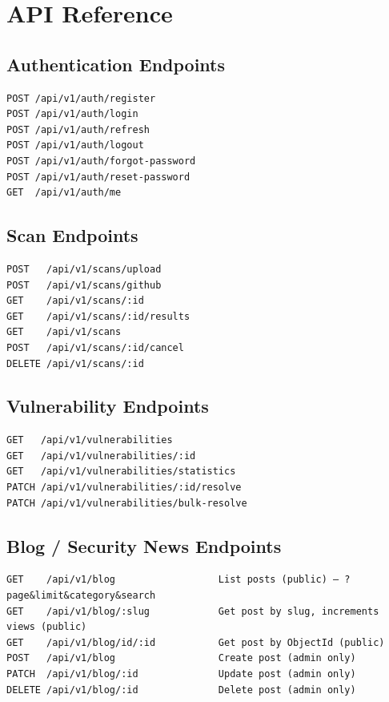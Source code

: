 \documentclass[12pt,a4paper]{report}
\begin{document}
\chapter{API Reference}
\label{app:api}

\section{Authentication Endpoints}

\begin{verbatim}
POST /api/v1/auth/register
POST /api/v1/auth/login
POST /api/v1/auth/refresh
POST /api/v1/auth/logout
POST /api/v1/auth/forgot-password
POST /api/v1/auth/reset-password
GET  /api/v1/auth/me
\end{verbatim}

\section{Scan Endpoints}

\begin{verbatim}
POST   /api/v1/scans/upload
POST   /api/v1/scans/github
GET    /api/v1/scans/:id
GET    /api/v1/scans/:id/results
GET    /api/v1/scans
POST   /api/v1/scans/:id/cancel
DELETE /api/v1/scans/:id
\end{verbatim}

\section{Vulnerability Endpoints}

\begin{verbatim}
GET   /api/v1/vulnerabilities
GET   /api/v1/vulnerabilities/:id
GET   /api/v1/vulnerabilities/statistics
PATCH /api/v1/vulnerabilities/:id/resolve
PATCH /api/v1/vulnerabilities/bulk-resolve
\end{verbatim}

\section{Blog / Security News Endpoints}

\begin{verbatim}
GET    /api/v1/blog                  List posts (public) — ?page&limit&category&search
GET    /api/v1/blog/:slug            Get post by slug, increments views (public)
GET    /api/v1/blog/id/:id           Get post by ObjectId (public)
POST   /api/v1/blog                  Create post (admin only)
PATCH  /api/v1/blog/:id              Update post (admin only)
DELETE /api/v1/blog/:id              Delete post (admin only)
\end{verbatim}
\end{document}
